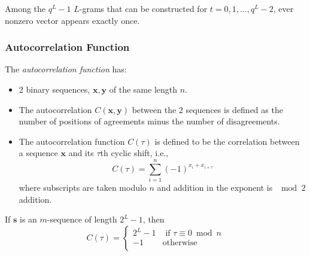 \begin{theorem}
  Among the $q^{L}-1$ $L$-grams that can be constructed for $t = 0, 1, \ldots, q^{L}-2$, ever nonzero vector appears exactly once.
\end{theorem}

\subsubsection{Autocorrelation Function}\label{subsubsec:Autocorrelation_Function}
\begin{definition}\label{def:LFSR_Autocorrelation_Function}
  The \emph{autocorrelation function} has:
  \begin{itemize}[noitemsep]
  \item 2 binary sequences, $\mathbf{x}, \mathbf{y}$ of the same length $n$.
  \item The autocorrelation $C(\mathbf{x}, \mathbf{y})$ between the 2 sequences is defined as the number of positions of agreements minus the number of disagreements.
  \item The autocorrelation function $C(\tau)$ is defined to be the correlation between a sequence $\mathbf{x}$ and its $\tau$th cyclic shift, i.e.,
    \begin{equation}\label{eq:LFSR_Autocorrelation_Function}
      C(\tau) = \sum\limits_{i=1}^{n} {(-1)}^{x_{i}+x_{i+\tau}}
    \end{equation}
    where subscripts are taken modulo $n$ and addition in the exponent is $\mod{2}$ addition.
  \end{itemize}
\end{definition}

\begin{theorem}\label{thm:M_Sequence_Autocorrelation}
  If $\mathbf{s}$ is an $m$-sequence of length $2^{L}-1$, then
  \begin{equation}\label{eq:M_Sequence_Autocorrelation}
    C(\tau) =
    \begin{cases}
      2^{L} - 1 & \text{ if } \tau \equiv 0 \bmod n \\
      -1 & \text{otherwise} \\
    \end{cases}
  \end{equation}
\end{theorem}
